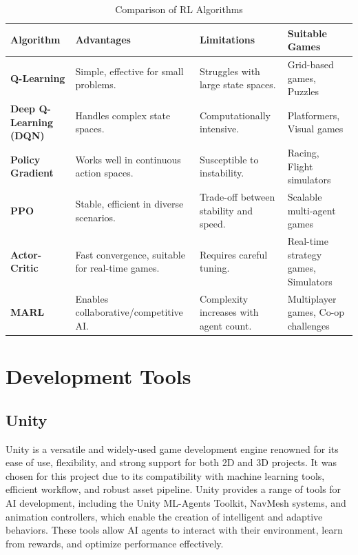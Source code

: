 \documentclass[12pt,oneside,openright,a4paper]{cpe-english-project}
\begin{document}
\begin{table}[H]
\caption{Comparison of RL Algorithms}\label{tbl:ComparisonofRLAlgorithms}
\renewcommand{\arraystretch}{1.5} %
\setlength{\tabcolsep}{4pt} %
\begin{tabularx}{\textwidth}{|>{\raggedright\arraybackslash}X|>{\raggedright\arraybackslash}X|>{\raggedright\arraybackslash}X|>{\raggedright\arraybackslash}X|}
\hline
\textbf{Algorithm} & \textbf{Advantages} & \textbf{Limitations} & \textbf{Suitable Games} \\ \hline
\textbf{Q-Learning} & Simple, effective for small problems. & Struggles with large state spaces. & Grid-based games, Puzzles \\ \hline
\textbf{Deep Q-Learning (DQN)} & Handles complex state spaces. & Computationally intensive. & Platformers, Visual games \\ \hline
\textbf{Policy Gradient} & Works well in continuous action spaces. & Susceptible to instability. & Racing, Flight simulators \\ \hline
\textbf{PPO} & Stable, efficient in diverse scenarios. & Trade-off between stability and speed. & Scalable multi-agent games \\ \hline
\textbf{Actor-Critic} & Fast convergence, suitable for real-time games. & Requires careful tuning. & Real-time strategy games, Simulators \\ \hline
\textbf{MARL} & Enables collaborative/competitive AI. & Complexity increases with agent count. & Multiplayer games, Co-op challenges \\ \hline
\end{tabularx}
\end{table}

\section{Development Tools}

\subsection{Unity}
Unity is a versatile and widely-used game development engine renowned for its ease of use, flexibility, and strong support for both 2D and 3D projects. It was chosen for this project due to its compatibility with machine learning tools, efficient workflow, and robust asset pipeline. Unity provides a range of tools for AI development, including the Unity ML-Agents Toolkit, NavMesh systems, and animation controllers, which enable the creation of intelligent and adaptive behaviors. These tools allow AI agents to interact with their environment, learn from rewards, and optimize performance effectively.
\end{document}
